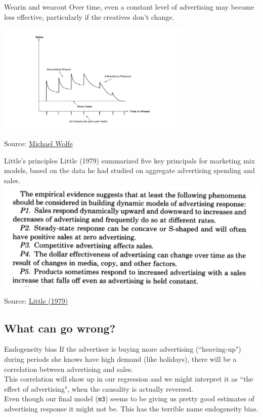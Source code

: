 \documentclass[10pt, aspectratio=169]{beamer}
\newcommand{\source}[1]{\begin{flushright} \footnotesize Source: {#1} \end{flushright} \normalsize}
\begin{document}
\begin{frame}{Wearin and wearout}
Over time, even a constant level of advertising may become less effective, particularly if the creatives don't change. 
\begin{center}
\includegraphics[width=0.7\textwidth]{images/adresponseovertime.png}
\end{center}
\source{\href{https://www.linkedin.com/pulse/new-tools-determining-measuring-wear-in-wear-out-media-michael-wolfe}{Michael Wolfe}}
\end{frame}

\begin{frame}{Little's principles}
Little (1979) summarized five key principals for marketing mix models, based on the data he had studied on aggregate advertising spending and sales. 
\includegraphics[width=\textwidth]{images/littleprincipals.png}
\source{\href{https://drive.google.com/uc?export=download&id=0B0EzanlzLNsWZkE1TWtNNVpBUzA}{Little (1979)}}
\end{frame}


\subsection{What can go wrong?}

\begin{frame}[fragile]{Endogeneity bias}
If the advertiser is buying more advertising (``heaving-up") during periods she knows have high demand (like holidays), there will be a correlation between advertising and sales. \\
\bigskip \pause
This correlation will show up in our regression and we might interpret it as ``the effect of advertising", when the causality is actually reversed. \\
\bigskip \pause 
Even though our final model (\verb|m3|) seems to be giving us pretty good estimates of advertising response it might not be.  This has the terrible name \alert{endogeneity bias}.
\end{frame}
\end{document}
